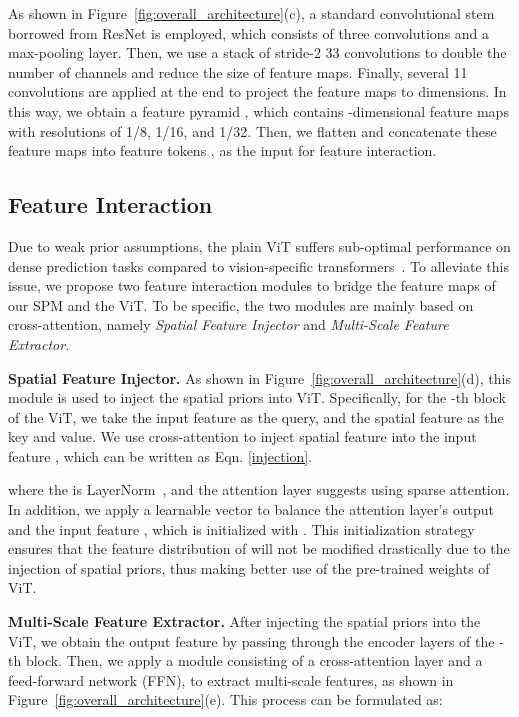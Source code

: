 \documentclass{article} \usepackage{iclr2023_conference,times}
\begin{document}
As shown in Figure~\ref{fig:overall_architecture}(c), a standard convolutional stem borrowed from ResNet \citep{he2016deep} is employed, which consists of three convolutions and a max-pooling layer. 
Then, we use a stack of stride-2 33 convolutions to double the number of channels and reduce the size of feature maps.
Finally, several 11 convolutions are applied at the end to project the feature maps to  dimensions.
In this way, we obtain a feature pyramid , which contains -dimensional feature maps with resolutions of 1/8, 1/16, and 1/32. 
Then, we flatten and concatenate these feature maps into feature tokens , as the input for feature interaction.



\subsection{Feature Interaction}
\label{feature_interaction}
Due to weak prior assumptions, the plain ViT suffers sub-optimal performance on dense prediction tasks compared to vision-specific transformers~\citep{chu2021twins,dong2021cswin,liu2021swin,wang2021pvtv2}.
To alleviate this issue, we propose two feature interaction modules to bridge the feature maps of our SPM and the ViT.
To be specific, the two modules are mainly based on cross-attention, namely \emph{Spatial Feature Injector} and \emph{Multi-Scale Feature Extractor}.



\noindent \textbf{Spatial Feature Injector.}
As shown in Figure~\ref{fig:overall_architecture}(d), this module is used to inject the spatial priors into ViT. Specifically, for the -th block of the ViT, we take the input feature  as the query, and the spatial feature  as the key and value. We use cross-attention 
to inject spatial feature  into the input feature , 
which can be written as Eqn. \ref{injection}.

where the  is LayerNorm~\citep{ba2016layer}, and the attention layer  suggests using sparse attention. 
In addition, we apply a learnable vector  to balance the attention layer's output and the input feature , which is initialized with . 
This initialization strategy ensures that the feature distribution of  will not be modified drastically due to the injection of spatial priors, thus making better use of the pre-trained weights of ViT.



\noindent \textbf{Multi-Scale Feature Extractor.}
After injecting the spatial priors into the ViT, we obtain the output feature  by passing  through the encoder layers of the -th block.
Then, we apply a module consisting of a cross-attention layer and a feed-forward network (FFN), to extract multi-scale features, as shown in Figure~\ref{fig:overall_architecture}(e).
This process can be formulated as:
\end{document}
